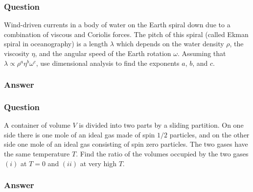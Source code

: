 \subsubsection{Question}
Wind-driven currents in a body of water on the Earth spiral down due to a combination of viscous and Coriolis forces. The pitch of this spiral (called Ekman spiral in oceanography) is a length $\lambda$ which depends on the water density $\rho$, the viscosity $\eta$, and the angular speed of the Earth rotation $\omega$. Assuming that $\lambda\propto\rho^a\eta^b\omega^c$, use dimensional analysis to find the exponents $a$, $b$, and $c$.

\subsubsection{Answer}



\subsubsection{Question}
A container of volume $V$ is divided into two parts by a sliding partition. On one side there is one mole of an ideal gas made of spin $1/2$ particles, and on the other side one mole of an ideal gas consisting of spin zero particles. The two gases have the same temperature $T$. Find the ratio of the volumes occupied by the two gases $(i)$ at $T = 0$ and $(ii)$ at very high $T$.

\subsubsection{Answer}

